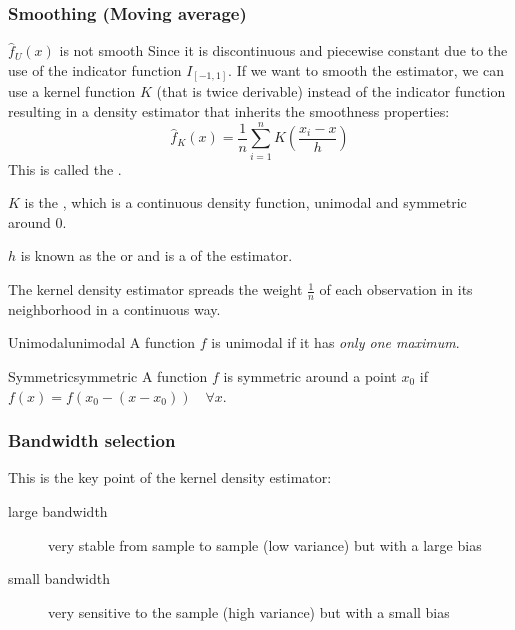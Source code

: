 \subsubsection{Smoothing (Moving average)}
\begin{prop}{$\widehat{f}_U(x)$ is not smooth}{}
	Since it is discontinuous and piecewise constant due to the use of the indicator
	function $I_{[-1,1]}$.
	\tcblower
	If we want to smooth the estimator, we can use a kernel function $K$ (that is twice derivable) instead
	of the indicator function resulting in a density estimator that inherits the
	smoothness properties:
	\begin{equation}
		\widehat{f}_K(x) = \frac{1}{n}\sum_{i=1}^n K\left( \frac{x_i - x}{h} \right)
		\tag{kernel density estimator}
	\end{equation}
	This is called the .

	$K$ is the , which is a continuous density function, unimodal
	and symmetric around $0$.

	$h$ is known as the  or  and is a
	 of the estimator.
\end{prop}

The kernel density estimator spreads the weight $\frac{1}{n}$ of each
observation in its neighborhood in a continuous way.

\begin{definition}{Unimodal}{unimodal}
    A function $f$ is unimodal if it has \emph{only one maximum}.
\end{definition}

\begin{definition}{Symmetric}{symmetric}
	A function $f$ is symmetric around a point $x_0$ if $f(x) = f(x_0 - (x - x_0)) \quad \forall x$.
\end{definition}

\subsubsection{Bandwidth selection}
\begin{marker}{}
	This is the key point of the kernel density estimator:

	\begin{description}
		\item[large bandwidth] very stable from sample to sample (low variance) but with a large bias
		\item[small bandwidth] very sensitive to the sample (high variance) but with a small bias
	\end{description}
\end{marker}


